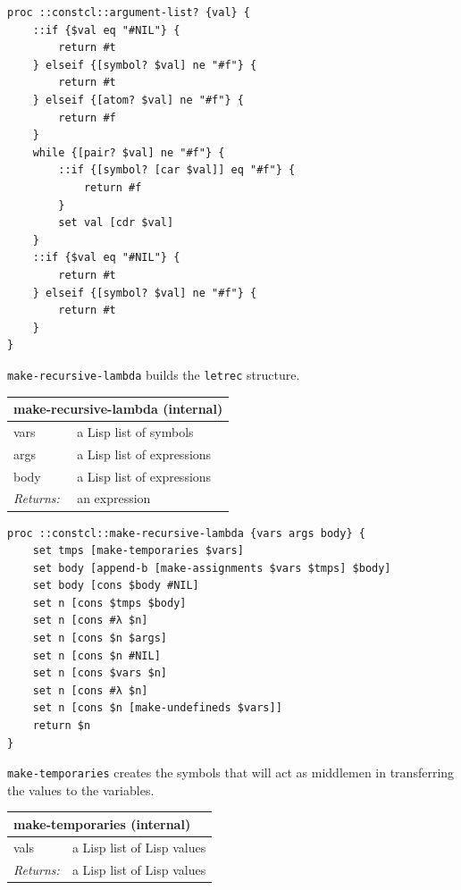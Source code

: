 \documentclass[twoside,9pt]{report}
\begin{document}
\noindent\makebox[\linewidth]{\rule{\linewidth}{0.4pt}}
\begin{lstlisting}
proc ::constcl::argument-list? {val} {
    ::if {$val eq "#NIL"} {
        return #t
    } elseif {[symbol? $val] ne "#f"} {
        return #t
    } elseif {[atom? $val] ne "#f"} {
        return #f
    }
    while {[pair? $val] ne "#f"} {
        ::if {[symbol? [car $val]] eq "#f"} {
            return #f
        }
        set val [cdr $val]
    }
    ::if {$val eq "#NIL"} {
        return #t
    } elseif {[symbol? $val] ne "#f"} {
        return #t
    }
}
\end{lstlisting}
\noindent\makebox[\linewidth]{\rule{\linewidth}{0.4pt}}

\texttt{make-recursive-lambda} builds the \texttt{letrec} structure.

\begin{tabular}{ |l l| }
\hline
\multicolumn{2}{|l|}{make-recursive-lambda (internal)} \\
\hline
vars & a Lisp list of symbols \\
args & a Lisp list of expressions \\
body & a Lisp list of expressions \\
\textit{Returns:} & an expression \\
\hline
\end{tabular}

\noindent\makebox[\linewidth]{\rule{\linewidth}{0.4pt}}
\begin{lstlisting}
proc ::constcl::make-recursive-lambda {vars args body} {
    set tmps [make-temporaries $vars]
    set body [append-b [make-assignments $vars $tmps] $body]
    set body [cons $body #NIL]
    set n [cons $tmps $body]
    set n [cons #λ $n]
    set n [cons $n $args]
    set n [cons $n #NIL]
    set n [cons $vars $n]
    set n [cons #λ $n]
    set n [cons $n [make-undefineds $vars]]
    return $n
}
\end{lstlisting}
\noindent\makebox[\linewidth]{\rule{\linewidth}{0.4pt}}

\texttt{make-temporaries} creates the symbols that will act as middlemen in transferring the values to the variables.

\begin{tabular}{ |l l| }
\hline
\multicolumn{2}{|l|}{make-temporaries (internal)} \\
\hline
vals & a Lisp list of Lisp values \\
\textit{Returns:} & a Lisp list of Lisp values \\
\hline
\end{tabular}
\end{document}
